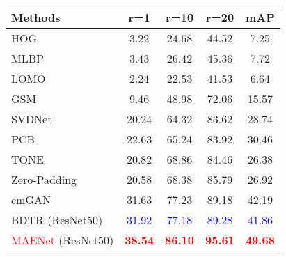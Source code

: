 \begin{table}[!htpb]
  \centering
  \begin{tabular}{cccccc}
     \\ \hline
  \multicolumn{2}{l|}{Methods} & r=1 &r=10 & r=20 & mAP   \\\hline
  
  \multicolumn{2}{l|}{HOG} & 3.22 & 24.68 & 44.52 & 7.25  \\
  \multicolumn{2}{l|}{MLBP} & 3.43 & 26.42 & 45.36 & 7.72  \\
  \multicolumn{2}{l|}{LOMO\cite{liao2015person}} &  2.24 & 22.53 & 41.53 & 6.64 \\
  \multicolumn{2}{l|}{GSM\cite{lin2016cross}} &  9.46 & 48.98 & 72.06 & 15.57  \\

  \hline
  \hline
  \multicolumn{2}{l|}{SVDNet\cite{sun2017svdnet}} & 20.24 & 64.32 & 83.62 & 28.74  \\
  \multicolumn{2}{l|}{PCB\cite{sun2018beyond}} & 22.63 & 65.24 & 83.92 & 30.46  \\ 
  \hline
  \hline
  \multicolumn{2}{l|}{TONE\cite{ye2018hierarchical}} &  20.82 & 68.86 & 84.46 & 26.38  \\
  \multicolumn{2}{l|}{Zero-Padding\cite{wu2017rgb} }& 20.58 & 68.38 & 85.79 & 26.92  \\
  \multicolumn{2}{l|}{cmGAN\cite{dai2018cross} }& 31.63 & 77.23 & 89.18 & 42.19  \\
  \multicolumn{2}{l|}{BDTR (ResNet50)\cite{ye2018visible} }& \textcolor{blue}{31.92} & \textcolor{blue}{77.18} & \textcolor{blue}{89.28} & \textcolor{blue}{41.86}  \\
  \hline
  \hline
   \multicolumn{2}{l|}{\textcolor{red}{MAENet} (ResNet50) }&\textcolor{red}{\textbf{38.54}} & \textcolor{red}{\textbf{86.10}} & \textcolor{red}{\textbf{95.61}} & \textcolor{red}{\textbf{49.68}} \\
   \hline
   \hline
  \end{tabular}
  \label{table:sysuindoor}
\end{table}


